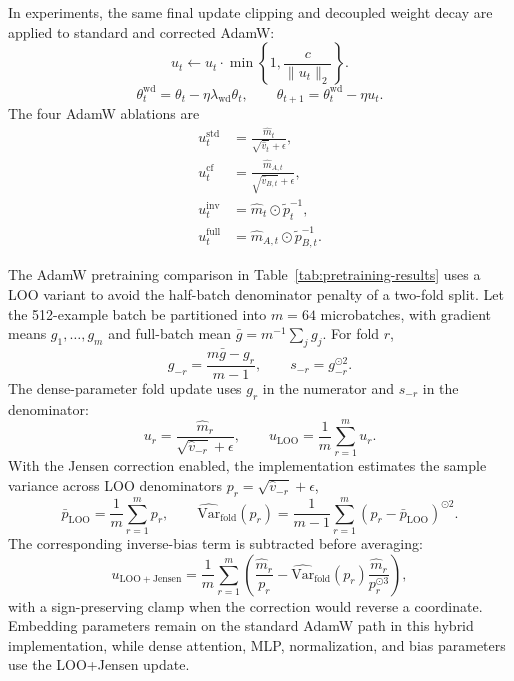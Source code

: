 \documentclass{article}
\newcommand{\Var}{\mathrm{Var}}
\begin{document}
In experiments, the same final update clipping and decoupled weight decay are applied to standard and corrected AdamW:
\begin{equation}
    u_t
    \leftarrow
    u_t\cdot \min\left\{1,\frac{c}{\|u_t\|_2}\right\}.
\end{equation}
\begin{equation}
    \theta_t^{\mathrm{wd}}
    =
    \theta_t-\eta\lambda_{\mathrm{wd}}\theta_t,
    \qquad
    \theta_{t+1}
    =
    \theta_t^{\mathrm{wd}}-\eta u_t.
\end{equation}
The four AdamW ablations are
\begin{align}
    u_t^{\mathrm{std}}
    &=
    \frac{\hat m_t}{\sqrt{\hat v_t}+\epsilon}, \\
    u_t^{\mathrm{cf}}
    &=
    \frac{\hat m_{A,t}}{\sqrt{\hat v_{B,t}}+\epsilon}, \\
    u_t^{\mathrm{inv}}
    &=
    \hat m_t\odot \widetilde p_t^{-1}, \\
    u_t^{\mathrm{full}}
    &=
    \hat m_{A,t}\odot \widetilde p_{B,t}^{-1}.
\end{align}

The AdamW pretraining comparison in Table~\ref{tab:pretraining-results} uses a LOO variant to avoid the half-batch denominator penalty of a two-fold split. Let the 512-example batch be partitioned into $m=64$ microbatches, with gradient means $g_1,\ldots,g_m$ and full-batch mean $\bar g=m^{-1}\sum_j g_j$. For fold $r$,
\begin{equation}
    g_{-r}
    =
    \frac{m\bar g-g_r}{m-1},
    \qquad
    s_{-r}=g_{-r}^{\odot 2}.
\end{equation}
The dense-parameter fold update uses $g_r$ in the numerator and $s_{-r}$ in the denominator:
\begin{equation}
    u_r
    =
    \frac{\hat m_r}{\sqrt{\hat v_{-r}}+\epsilon},
    \qquad
    u_{\mathrm{LOO}}
    =
    \frac{1}{m}\sum_{r=1}^m u_r.
\end{equation}
With the Jensen correction enabled, the implementation estimates the sample variance across LOO denominators $p_r=\sqrt{\hat v_{-r}}+\epsilon$,
\begin{equation}
    \bar p_{\mathrm{LOO}}
    =
    \frac{1}{m}\sum_{r=1}^m p_r,
    \qquad
    \widehat{\Var}_{\mathrm{fold}}(p_r)
    =
    \frac{1}{m-1}\sum_{r=1}^m
    (p_r-\bar p_{\mathrm{LOO}})^{\odot 2}.
\end{equation}
The corresponding inverse-bias term is subtracted before averaging:
\begin{equation}
    u_{\mathrm{LOO+Jensen}}
    =
    \frac{1}{m}\sum_{r=1}^m
    \left(
    \frac{\hat m_r}{p_r}
    -
    \widehat{\Var}_{\mathrm{fold}}(p_r)
    \frac{\hat m_r}{p_r^{\odot 3}}
    \right),
\end{equation}
with a sign-preserving clamp when the correction would reverse a coordinate. Embedding parameters remain on the standard AdamW path in this hybrid implementation, while dense attention, MLP, normalization, and bias parameters use the LOO+Jensen update.
\end{document}
